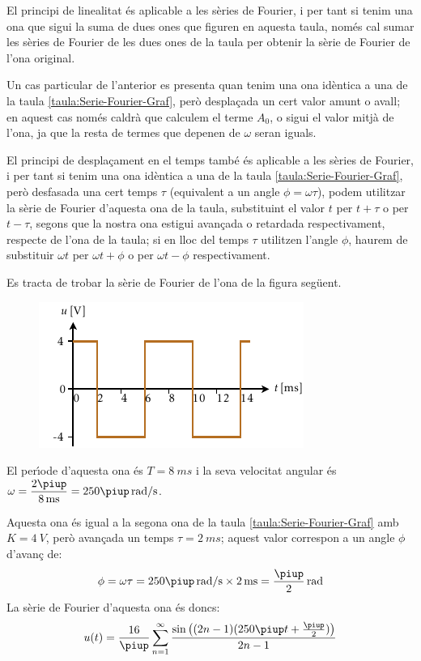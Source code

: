 El principi de linealitat \'{e}s aplicable a les s\`{e}ries de Fourier, i per tant si tenim una ona que sigui la suma de dues ones que figuren en aquesta taula, nom\'{e}s  cal sumar les s\`{e}ries de Fourier de les dues ones de la taula per obtenir la s\`{e}rie de Fourier de l'ona original.

Un cas particular de l'anterior es presenta quan tenim una ona  id\`{e}ntica a una de la taula \vref{taula:Serie-Fourier-Graf}, per\`{o} despla\c{c}ada un cert valor amunt o avall; en aquest cas nom\'{e}s caldr\`{a} que calculem el terme $A_0$, o sigui el valor mitj\`{a} de l'ona, ja que la resta de termes que depenen de $\omega$ seran iguals.

El principi de despla\c{c}ament en el temps tamb\'{e} \'{e}s aplicable a les s\`{e}ries de Fourier, i per tant si tenim una ona id\`{e}ntica a una de la taula \vref{taula:Serie-Fourier-Graf}, per\`{o} desfasada una cert temps $\tau$ (equivalent a un angle $\phi = \omega \tau$), podem utilitzar la s\`{e}rie de Fourier d'aquesta ona de la taula, substituint el valor $t$ per $t+\tau$ o per $t-\tau$, segons que la nostra ona estigui avan\c{c}ada o retardada respectivament, respecte de l'ona de la taula; si en lloc del temps $\tau$ utilitzen l'angle $\phi$, haurem de substituir  $\omega t$ per $\omega t + \phi$ o per $\omega t - \phi$ respectivament.


\begin{exemple}
Es tracta de trobar la s\`{e}rie de Fourier de l'ona de la figura seg\"{u}ent.
\begin{figure}[h]
\centering
    \includegraphics{Imatges/Cap-Fourier-Exemple-Taula.pdf}
\end{figure}

El per\'{\i}ode d'aquesta ona \'{e}s $T=\SI{8}{ms}$ i la seva velocitat angular \'{e}s $\omega = \dfrac{2\piup}{\SI{8}{ms}} = 250 \piup\unit{rad/s}$.

Aquesta ona \'{e}s igual a la segona ona de la taula \vref{taula:Serie-Fourier-Graf} amb $K=\SI{4}{V}$, per\`{o} avan\c{c}ada un temps $\tau=\SI{2}{ms}$; aquest valor correspon a un angle $\phi$ d'avan\c{c} de:
\[
    \phi = \omega \tau = 250\piup\unit{rad/s} \times \SI{2}{ms} = \frac{\piup}{2}\unit{rad}
\]
La s\`{e}rie de Fourier d'aquesta ona \'{e}s doncs:
\[
u(t) = \frac{{16}}{\piup }\sum\limits_{n = 1}^\infty  {\frac{{\sin \big((2n - 1)(250\piup t+ \frac{\piup}{2})\big)}}{{2n - 1}}}
\]
\end{exemple}

